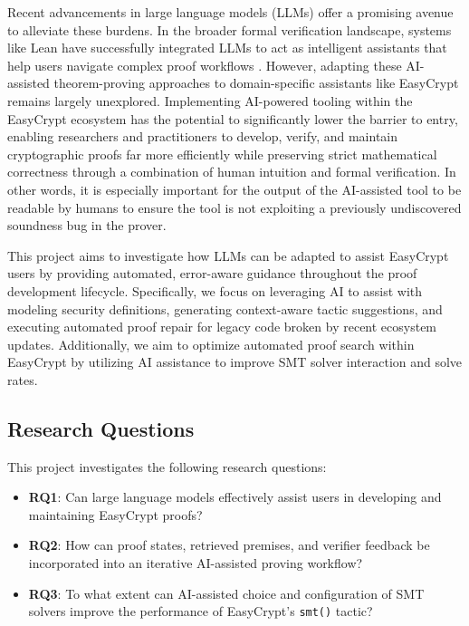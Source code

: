 \documentclass[acmsmall,natbib=false]{acmart}
\begin{document}
Recent advancements in large language models (LLMs) offer a promising avenue to alleviate these burdens. In the broader formal verification landscape, systems like Lean have successfully integrated LLMs to act as intelligent assistants that help users navigate complex proof workflows \cite{leancopilot}. However, adapting these AI-assisted theorem-proving approaches to domain-specific assistants like EasyCrypt remains largely unexplored. Implementing AI-powered tooling within the EasyCrypt ecosystem has the potential to significantly lower the barrier to entry, enabling researchers and practitioners to develop, verify, and maintain cryptographic proofs far more efficiently while preserving strict mathematical correctness through a combination of human intuition and formal verification. In other words, it is especially important for the output of the AI-assisted tool to be readable by humans to ensure the tool is not exploiting a previously undiscovered soundness bug in the prover.

This project aims to investigate how LLMs can be adapted to assist EasyCrypt users by providing automated, error-aware guidance throughout the proof development lifecycle. Specifically, we focus on leveraging AI to assist with modeling security definitions, generating context-aware tactic suggestions, and executing automated proof repair for legacy code broken by recent ecosystem updates. Additionally, we aim to optimize automated proof search within EasyCrypt by utilizing AI assistance to improve SMT solver interaction and solve rates.

\subsection{Research Questions}
This project investigates the following research questions:

\begin{itemize}
    \item \textbf{RQ1}: Can large language models effectively assist users in developing and maintaining EasyCrypt proofs?
    \item \textbf{RQ2}: How can proof states, retrieved premises, and verifier feedback be incorporated into an iterative AI-assisted proving workflow?
    \item \textbf{RQ3}: To what extent can AI-assisted choice and configuration of SMT solvers improve the performance of EasyCrypt's \texttt{smt()} tactic?
\end{itemize}
\end{document}
